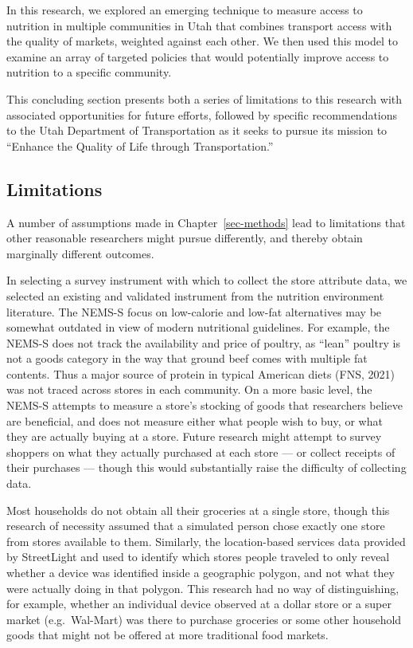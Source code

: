 \documentclass[
  letterpaper,
  authoryear,
  review,
  3p]{elsarticle}
\begin{document}
In this research, we explored an emerging technique to measure access to
nutrition in multiple communities in Utah that combines transport access
with the quality of markets, weighted against each other. We then used
this model to examine an array of targeted policies that would
potentially improve access to nutrition to a specific community.

This concluding section presents both a series of limitations to this
research with associated opportunities for future efforts, followed by
specific recommendations to the Utah Department of Transportation as it
seeks to pursue its mission to ``Enhance the Quality of Life through
Transportation.''

\hypertarget{sec-limitations}{%
\subsection{Limitations}\label{sec-limitations}}

A number of assumptions made in Chapter~\ref{sec-methods} lead to
limitations that other reasonable researchers might pursue differently,
and thereby obtain marginally different outcomes.

In selecting a survey instrument with which to collect the store
attribute data, we selected an existing and validated instrument from
the nutrition environment literature. The NEMS-S focus on low-calorie
and low-fat alternatives may be somewhat outdated in view of modern
nutritional guidelines. For example, the NEMS-S does not track the
availability and price of poultry, as ``lean'' poultry is not a goods
category in the way that ground beef comes with multiple fat contents.
Thus a major source of protein in typical American diets (FNS, 2021) was
not traced across stores in each community. On a more basic level, the
NEMS-S attempts to measure a store's stocking of goods that researchers
believe are beneficial, and does not measure either what people wish to
buy, or what they are actually buying at a store. Future research might
attempt to survey shoppers on what they actually purchased at each store
--- or collect receipts of their purchases --- though this would
substantially raise the difficulty of collecting data.

Most households do not obtain all their groceries at a single store,
though this research of necessity assumed that a simulated person chose
exactly one store from stores available to them. Similarly, the
location-based services data provided by StreetLight and used to
identify which stores people traveled to only reveal whether a device
was identified inside a geographic polygon, and not what they were
actually doing in that polygon. This research had no way of
distinguishing, for example, whether an individual device observed at a
dollar store or a super market (e.g.~Wal-Mart) was there to purchase
groceries or some other household goods that might not be offered at
more traditional food markets.
\end{document}
